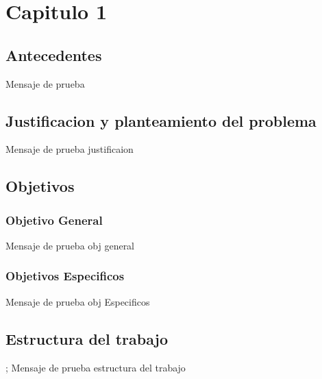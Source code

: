 \chapter*{Capitulo 1}
\label{intro}

\section{Antecedentes}
Mensaje de prueba
\section{Justificacion y planteamiento del problema}
Mensaje de prueba justificaion
\section{Objetivos}
\subsection{Objetivo General}
Mensaje de prueba obj general
\subsection{Objetivos Especificos}
Mensaje de prueba obj Especificos
\section{Estructura del trabajo};
Mensaje de prueba estructura del trabajo



